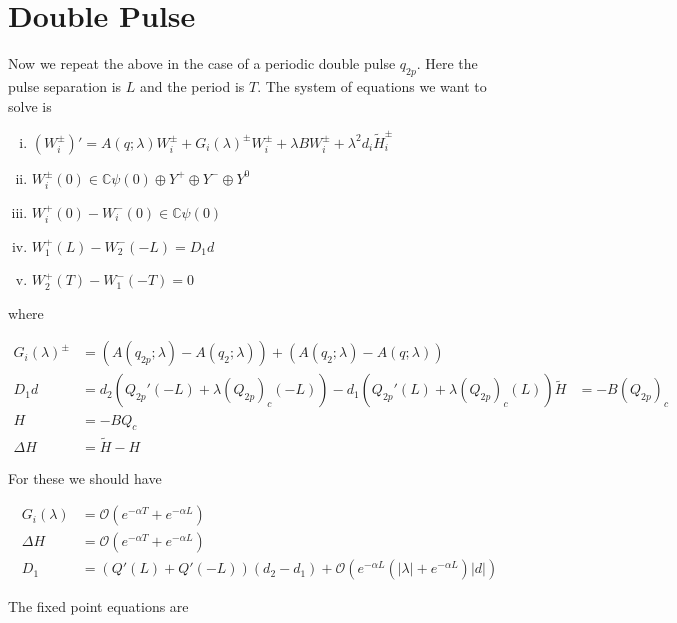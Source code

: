 \documentclass[12pt]{article}
\def\C{{\mathbb C}}
\begin{document}
\section*{Double Pulse}

Now we repeat the above in the case of a periodic double pulse $q_{2p}$. Here the pulse separation is $L$ and the period is $T$. The system of equations we want to solve is

\begin{enumerate}[(i)]
\item $(W_i^\pm)' = A(q; \lambda) W_i^\pm + G_i(\lambda)^\pm W_i^\pm + \lambda B W_i^\pm + \lambda^2 d_i \tilde{H}_i^\pm$
\item $W_i^\pm(0) \in \C \psi(0) \oplus Y^+ \oplus Y^- \oplus Y^0$
\item $W_i^+(0) - W_i^-(0) \in \C \psi(0) $
\item $W_1^+(L) - W_2^-(-L) = D_1 d $
\item $W_2^+(T) - W_1^-(-T) = 0$
\end{enumerate}

where

\begin{align*}
G_i(\lambda)^\pm &= (A(q_{2p};\lambda) - A(q_2;\lambda)) + (A(q_{2};\lambda) - A(q;\lambda)) \\
D_1 d &= d_2(Q_{2p}'(-L) + \lambda (Q_{2p})_c(-L)) 
- d_1 ( Q_{2p}'(L) + \lambda (Q_{2p})_c(L) )
\tilde{H} &= -B(Q_{2p})_c \\
H &= -B Q_c \\
\Delta H &= \tilde{H} - H
\end{align*}

For these we should have

\begin{align*}
G_i(\lambda) &= \mathcal{O}(e^{-\alpha T} + e^{-\alpha L}) \\
\Delta H &= \mathcal{O}(e^{-\alpha T} + e^{-\alpha L}) \\
D_1 &= ( Q'(L) + Q'(-L) )(d_2 - d_1 ) + \mathcal{O} \left( e^{-\alpha L} \left( |\lambda| +  e^{-\alpha L}  \right) |d| \right)
\end{align*}

The fixed point equations are 
\end{document}
